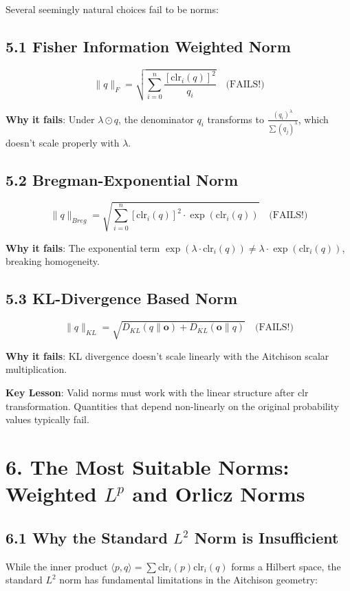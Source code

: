 \documentclass{amsart}
\theoremstyle{plain}
\theoremstyle{definition}
\theoremstyle{remark}
\begin{document}
Several seemingly natural choices fail to be norms:

\subsection{5.1 Fisher Information Weighted Norm}
\[
\|q\|_F = \sqrt{\sum_{i=0}^n \frac{[\text{clr}_i(q)]^2}{q_i}} \quad \text{(FAILS!)}
\]

\textbf{Why it fails}: Under $\lambda \odot q$, the denominator $q_i$ transforms to $\frac{(q_i)^\lambda}{\sum (q_j)^\lambda}$, which doesn't scale properly with $\lambda$.

\subsection{5.2 Bregman-Exponential Norm}
\[
\|q\|_{Breg} = \sqrt{\sum_{i=0}^n [\text{clr}_i(q)]^2 \cdot \exp(\text{clr}_i(q))} \quad \text{(FAILS!)}
\]

\textbf{Why it fails}: The exponential term $\exp(\lambda \cdot \text{clr}_i(q)) \neq \lambda \cdot \exp(\text{clr}_i(q))$, breaking homogeneity.

\subsection{5.3 KL-Divergence Based Norm}
\[
\|q\|_{KL} = \sqrt{D_{KL}(q\|\mathbf{o}) + D_{KL}(\mathbf{o}\|q)} \quad \text{(FAILS!)}
\]

\textbf{Why it fails}: KL divergence doesn't scale linearly with the Aitchison scalar multiplication.

\textbf{Key Lesson}: Valid norms must work with the linear structure after clr transformation. Quantities that depend non-linearly on the original probability values typically fail.

\section{6. The Most Suitable Norms: Weighted \texorpdfstring{$L^p$}{L^p} and Orlicz Norms}

\subsection{6.1 Why the Standard \texorpdfstring{$L^2$}{L^2} Norm is Insufficient}

While the inner product $\langle p,q \rangle = \sum \text{clr}_i(p)\text{clr}_i(q)$ forms a Hilbert space, the standard $L^2$ norm has fundamental limitations in the Aitchison geometry:
\end{document}
